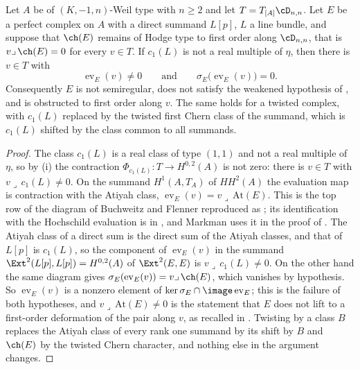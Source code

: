 \begin{theorem}
\label{thm:linebundle}
Let $A$ be of $(K,-1,n)$-Weil type with $n\ge2$ and let $T=T_{[A]}\cD_{n,n}$.
Let $E$ be a perfect complex on $A$ with a direct summand $L[p]$, $L$ a line
bundle, and suppose that $\ch(E)$ remains of Hodge type to first order along
$\cD_{n,n}$, that is $v\lrcorner\,\ch(E)=0$ for every $v\in T$. If $c_{1}(L)$
is not a real multiple of $\eta$, then there is $v\in T$ with
\[
  \operatorname{ev}_{E}(v)\ne0
  \qquad\text{and}\qquad
  \sigma_{E}\bigl(\operatorname{ev}_{E}(v)\bigr)=0 .
\]
Consequently $E$ is not semiregular, does not satisfy the weakened hypothesis
of \cite[Question 11.4]{Mar25b}, and is obstructed to first order along $v$.
The same holds for a twisted complex, with $c_{1}(L)$ replaced by the twisted
first Chern class of the summand, which is $c_{1}(L)$ shifted by the class
common to all summands.
\end{theorem}

\begin{proof}
The class $c_{1}(L)$ is a real class of type $(1,1)$ and not a real multiple
of $\eta$, so by (i) the contraction
$\Phi_{c_{1}(L)}\colon T\to H^{0,2}(A)$ is not zero: there is $v\in T$ with
$v\lrcorner\,c_{1}(L)\ne0$. On the summand $H^{1}(A,T_{A})$ of $HH^{2}(A)$ the
evaluation map is contraction with the Atiyah class,
$\operatorname{ev}_{E}(v)=v\lrcorner\,\mathrm{At}(E)$. This is the top row of
the diagram of Buchweitz and Flenner reproduced as \cite[(2.1)]{Mar25b}; its
identification with the Hochschild evaluation is in \cite{BF08}, and Markman
uses it in the proof of \cite[Lemma~11.3]{Mar25b}. The Atiyah class of a
direct sum is the direct sum of the Atiyah classes, and that of $L[p]$ is
$c_{1}(L)$, so the
component of $\operatorname{ev}_{E}(v)$ in the summand
$\Ext^{2}(L[p],L[p])=H^{0,2}(A)$ of $\Ext^{2}(E,E)$ is
$v\lrcorner\,c_{1}(L)\ne0$. On the other hand the same diagram gives
$\sigma_{E}(\operatorname{ev}_{E}(v))=v\lrcorner\,\ch(E)$, which vanishes by
hypothesis. So $\operatorname{ev}_{E}(v)$ is a nonzero element of
$\ker\sigma_{E}\cap\image\operatorname{ev}_{E}$; this is the failure of both
hypotheses, and $v\lrcorner\,\mathrm{At}(E)\ne0$ is the statement that $E$
does not lift to a first-order deformation of the pair along $v$, as recalled
in \cite[Section 2]{Mar25b}. Twisting by a class $B$ replaces the Atiyah
class of every rank one summand by its shift by $B$ and $\ch(E)$ by the
twisted Chern character, and nothing else in the argument changes.
\end{proof}

